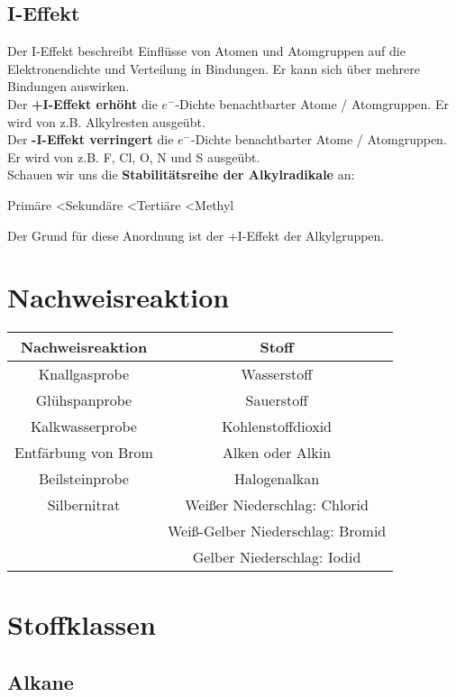 \documentclass[a4paper]{article}
\begin{document}
\subsection{I-Effekt}
Der I-Effekt beschreibt Einflüsse von Atomen und Atomgruppen auf die Elektronendichte und Verteilung in Bindungen.
Er kann sich über mehrere Bindungen auswirken.\\[5mm]
Der \textbf{+I-Effekt erhöht} die $e^-$-Dichte benachtbarter Atome / Atomgruppen. Er wird von z.B. Alkylresten ausgeübt.\\[5mm]
Der \textbf{-I-Effekt verringert} die $e^-$-Dichte benachtbarter Atome / Atomgruppen. Er wird von z.B. F, Cl, O, N und S ausgeübt.\\[5mm]
Schauen wir uns die \textbf{Stabilitätsreihe der Alkylradikale} an:
\begin{center}
    Primäre \quad<\quad Sekundäre \quad<\quad Tertiäre \quad<\quad Methyl\\
\end{center}
Der Grund für diese Anordnung ist der +I-Effekt der Alkylgruppen.

\section{Nachweisreaktion}
\begin{center}
    \begin{tabular}{|c | c|} \hline
        \textbf{Nachweisreaktion} & \textbf{Stoff} \\ \hline
        Knallgasprobe &Wasserstoff \\
        Glühspanprobe &Sauerstoff \\
        Kalkwasserprobe &Kohlenstoffdioxid \\
        Entfärbung von Brom &Alken oder Alkin \\
        Beilsteinprobe & Halogenalkan \\ \hline
        Silbernitrat & Weißer Niederschlag: Chlorid \\
        \quad & Weiß-Gelber Niederschlag: Bromid \\
        \quad & Gelber Niederschlag: Iodid \\ \hline
    \end{tabular}
\end{center}


\newpage
\section{Stoffklassen}
\subsection{Alkane}
\end{document}
